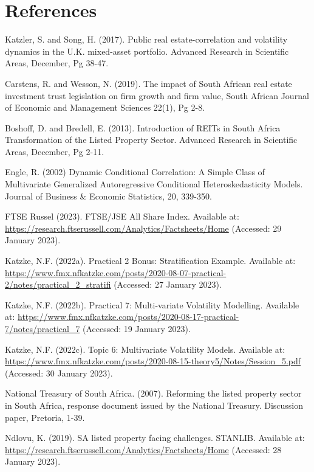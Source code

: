 \documentclass[11pt,preprint, authoryear]{elsarticle}
\numberwithin{equation}{section}
\numberwithin{figure}{section}
\numberwithin{table}{section}
\begin{document}
\newpage

\hypertarget{references}{%
\section*{References}\label{references}}

Katzler, S. and Song, H. (2017). Public real estate-correlation and
volatility dynamics in the U.K. mixed-asset portfolio. Advanced Research
in Scientific Areas, December, Pg 38-47.

Carstens, R. and Wesson, N. (2019). The impact of South African real
estate investment trust legislation on firm growth and firm value, South
African Journal of Economic and Management Sciences 22(1), Pg 2-8.

Boshoff, D. and Bredell, E. (2013). Introduction of REITs in South
Africa Transformation of the Listed Property Sector. Advanced Research
in Scientific Areas, December, Pg 2-11.

Engle, R. (2002) Dynamic Conditional Correlation: A Simple Class of
Multivariate Generalized Autoregressive Conditional Heteroskedasticity
Models. Journal of Business \& Economic Statistics, 20, 339-350.

FTSE Russel (2023). FTSE/JSE All Share Index. Available at:
\url{https://research.ftserussell.com/Analytics/Factsheets/Home}
(Accessed: 29 January 2023).

Katzke, N.F. (2022a). Practical 2 Bonus: Stratification Example.
Available at:
\url{https://www.fmx.nfkatzke.com/posts/2020-08-07-practical-2/notes/practical_2_stratifi}
(Accessed: 27 January 2023).

Katzke, N.F. (2022b). Practical 7: Multi-variate Volatility Modelling.
Available at:
\url{https://www.fmx.nfkatzke.com/posts/2020-08-17-practical-7/notes/practical_7}
(Accessed: 19 January 2023).

Katzke, N.F. (2022c). Topic 6: Multivariate Volatility Models. Available
at:
\url{https://www.fmx.nfkatzke.com/posts/2020-08-15-theory5/Notes/Session_5.pdf}
(Accessed: 30 January 2023).

National Treasury of South Africa. (2007). Reforming the listed property
sector in South Africa, response document issued by the National
Treasury. Discussion paper, Pretoria, 1-39.

Ndlovu, K. (2019). SA listed property facing challenges. STANLIB.
Available at:
\url{https://research.ftserussell.com/Analytics/Factsheets/Home}
(Accessed: 28 January 2023).
\end{document}
